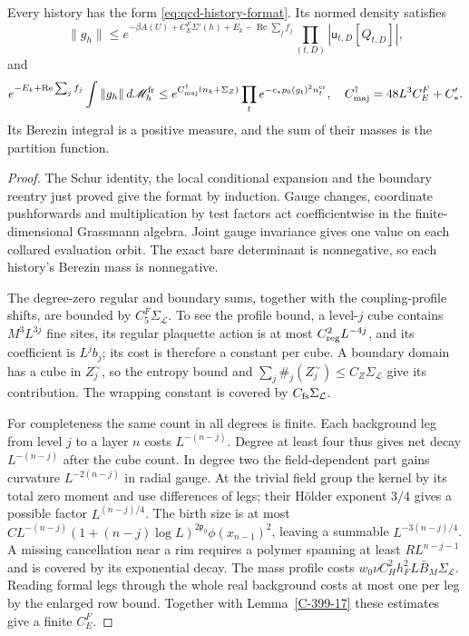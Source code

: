 \documentclass[11pt,letterpaper,reqno]{amsart}
\makeatletter
\theoremstyle{definition}
\newcommand{\ms@majorstart}{%
  \pushQED{\qed}\renewcommand{\qedsymbol}{$\blacksquare\square$}}
\newenvironment{theorem}[1][]{\ms@majorstart\ms@theorem[#1]}
  {\popQED\endms@theorem}
\theoremstyle{remark}
\makeatother
\begin{document}
\begin{theorem}[The upper history bound]\label{C-399-3}
Every history has the form \eqref{eq:qcd-history-format}.
Its normed density satisfies
\[
 \|g_h\|\le
 e^{-\beta A(U)+C_E^F\Sigma'(h)+E_k-\operatorname{Re}\sum_jf_j}
 \prod_{(t,D)}|\mathsf u_{t,D}[Q_{t,D}]|,
\]
and
\[
 e^{-E_k+\operatorname{Re}\sum_jf_j}\int\|g_h\|\,d\mathscr M_h^{\rm fr}
 \le e^{C_{\rm maj}^\dagger(n_k+\Sigma_Z)}
 \prod_t e^{-c_*p_0(g_t)^2n_t^{\rm cr}},
 \quad C_{\rm maj}^\dagger=48L^3C_E^F+C_*'.
\]
Its Berezin integral is a positive measure, and the sum of
their masses is the partition function.
\end{theorem}
\begin{proof}
The Schur identity, the local conditional expansion and the
boundary reentry just proved give the format by induction.
Gauge changes, coordinate pushforwards and multiplication by
test factors act coefficientwise in the finite-dimensional
Grassmann algebra. Joint gauge invariance gives one value on
each collared evaluation orbit. The exact bare determinant
is nonnegative, so each history's Berezin mass is nonnegative.

The degree-zero regular and boundary sums, together with the
coupling-profile shifts, are bounded by
$C_5^F\Sigma_{\mathcal L}$. To see the profile bound, a
level-$j$ cube contains $M^3L^{3j}$ fine sites, its regular
plaquette action is at most $C_{\rm reg}^2L^{-4j}$, and its
coefficient is $L^jb_j$; its cost is therefore a constant
per cube. A boundary domain has a cube in $Z_j^\sim$, so the
entropy bound and
$\sum_j\#_j(Z_j^\sim)\le C_Z\Sigma_{\mathcal L}$ give its
contribution. The wrapping constant is covered by
$C_{\rm fs}\Sigma_{\mathcal L}$.

For completeness the same count in all degrees is finite.
Each background leg from level $j$ to a layer $n$ costs
$L^{-(n-j)}$. Degree at least four thus gives net decay
$L^{-(n-j)}$ after the cube count. In degree two the
field-dependent part gains curvature $L^{-2(n-j)}$ in radial
gauge. At the trivial field group the kernel by its total
zero moment and use differences of legs; their H\"older
exponent $3/4$ gives a possible factor $L^{(n-j)/4}$.
The birth size is at most
$CL^{-(n-j)}(1+(n-j)\log L)^{2\mathfrak p_0}
\phi(x_{n-1})^2$, leaving a summable $L^{-3(n-j)/4}$.
A missing cancellation near a rim requires a polymer spanning
at least $RL^{n-j-1}$ and is covered by its exponential
decay. The mass profile costs
$w_0\nu C_H^2h_F^2L\bar B_M\Sigma_{\mathcal L}$.
Reading formal legs through the whole real background costs
at most one per leg by the enlarged row bound. Together with
Lemma~\ref{C-399-17} these estimates give a finite $C_E^F$.


\end{proof}
\end{document}
